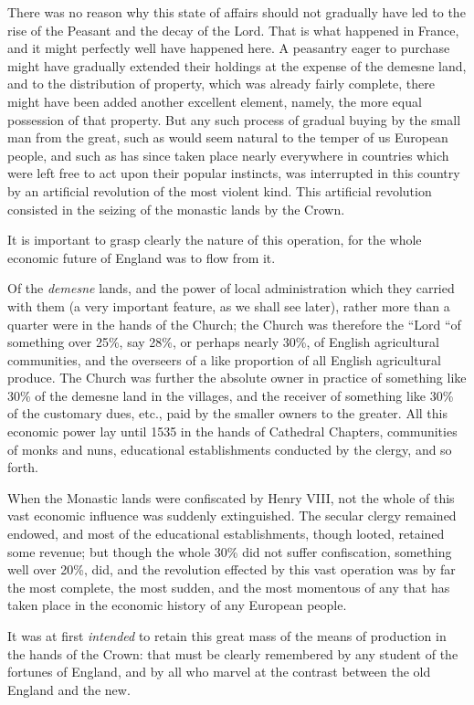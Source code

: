 \documentclass{book}
\begin{document}
There was no reason why this state of affairs should not gradually have led to the rise of the Peasant and the decay of the Lord. That is what happened in France, and it might perfectly well have happened here. A peasantry eager to purchase might have gradually extended their holdings at the expense of the demesne land, and to the distribution of property, which was already fairly complete, there might have been added another excellent element, namely, the more equal possession of that property. But any such process of gradual buying by the small man from the great, such as would seem natural to the temper of us European people, and such as has since taken place nearly everywhere in countries which were left free to act upon their popular instincts, was interrupted in this country by an artificial revolution of the most violent kind. This artificial revolution consisted in the seizing of the monastic lands by the Crown.

It is important to grasp clearly the nature of this operation, for the whole economic future of England was to flow from it.

Of the \emph{demesne} lands, and the power of local administration which they carried with them (a very important feature, as we shall see later), rather more than a quarter were in the hands of the Church; the Church was therefore the “Lord “of something over 25\%, say 28\%, or perhaps nearly 30\%, of English agricultural communities, and the overseers of a like proportion of all English agricultural produce. The Church was further the absolute owner in practice of something like 30\% of the demesne land in the villages, and the receiver of something like 30\% of the customary dues, etc., paid by the smaller owners to the greater. All this economic power lay until 1535 in the hands of Cathedral Chapters, communities of monks and nuns, educational establishments conducted by the clergy, and so forth.

When the Monastic lands were confiscated by Henry VIII, not the whole of this vast economic influence was suddenly extinguished. The secular clergy remained endowed, and most of the educational establishments, though looted, retained some revenue; but though the whole 30\% did not suffer confiscation, something well over 20\%, did, and the revolution effected by this vast operation was by far the most complete, the most sudden, and the most momentous of any that has taken place in the economic history of any European people.

It was at first \emph{intended} to retain this great mass of the means of production in the hands of the Crown: that must be clearly remembered by any student of the fortunes of England, and by all who marvel at the contrast between the old England and the new.
\end{document}
